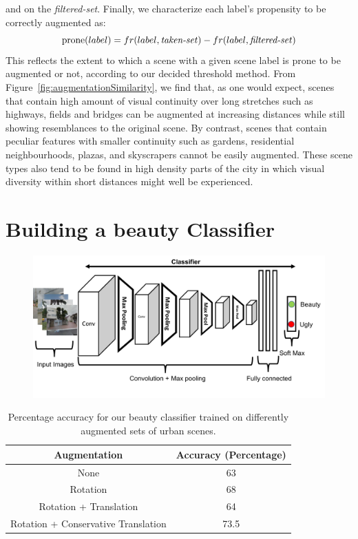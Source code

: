 and on the \emph{filtered-set}. Finally, we characterize each label's propensity to be correctly augmented as:
\begin{equation}
    \textrm{prone}(label)= fr(label,\textrm{\emph{taken-set}}) - fr(label,\textrm{\emph{filtered-set}})
\end{equation} 
This reflects the extent to which a scene with a given scene label is prone to be augmented or not, according to our decided threshold method. From Figure~\ref{fig:augmentationSimilarity}, we find that, as one would expect, scenes that contain high amount of visual continuity over long stretches such as highways, fields and bridges can be augmented at increasing distances while still showing resemblances to the original scene. By contrast, scenes that contain peculiar features with smaller continuity such as gardens, residential neighbourhoods, plazas, and skyscrapers cannot be easily augmented. These scene types also tend to be found in high density parts of the city in which visual diversity within short distances might well be experienced. 

\section{Building a beauty Classifier}

\begin{figure}[t!]
    \centering
    \includegraphics[width=\columnwidth]{Classifier_arch.pdf}
    \caption{}
    \label{fig:classifier_arch}
\end{figure}

\label{sec:framework}
\begin{table}[ht!]
    \centering
    \begin{tabular}{|c|c|}
        \hline
        \textbf{Augmentation} & \textbf{Accuracy (Percentage)}\\
        \hline
        None & 63 \\
        \hline
        Rotation  & 68 \\
        \hline
        Rotation + Translation  & 64 \\
        \hline
        Rotation + Conservative Translation & 73.5 \\
        \hline
    \end{tabular}
    \caption{Percentage accuracy for our beauty classifier trained on differently augmented sets of  urban scenes.}
    \label{tab:classifier}
    \vspace{-10mm}
\end{table}

